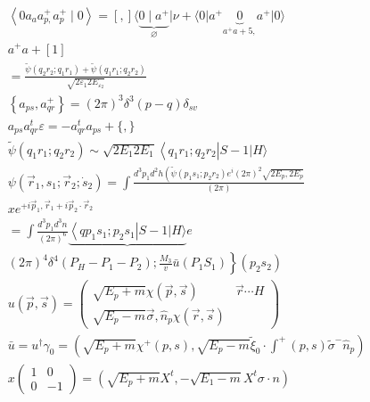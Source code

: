 \documentclass[10pt]{article}
\begin{document}
\[
\begin{aligned}
& \left\langle 0 a_{a} a_{p,}^{+} a_{p}^{+} \mid 0\right\rangle=[,]\langle\underbrace{0 \mid a^{+}}_{\varnothing}| \nu+\langle 0| a^{+} \underbrace{0}_{a^{+} a+5,} a^{+}|0\rangle \\
& a^{+} a+[1] \\
& =\frac{\tilde{\psi}\left(q_{2} r_{2} ; q_{1} r_{1}\right)+\tilde{\psi}\left(q_{1} r_{1} ; q_{2} r_{2}\right)}{\sqrt{2 \varepsilon_{1} 2 E_{\varepsilon_{2}}}} \\
& \left\{a_{p s}, a_{q r}^{+}\right\}=(2 \pi)^{3} \delta^{3}(p-q) \delta_{s v} \\
& a_{p s} a_{q r}^{t} \varepsilon=-a_{q r}^{t} a_{p s}+\{,\} \\
& \widetilde{\psi}\left(q_{1} r_{1} ; q_{2} r_{2}\right) \sim \sqrt{2 E_{1} 2 E_{1}}\left\langle q_{1} r_{1} ; q_{2} r_{2}\right| S-1|H\rangle \\
& \psi\left(\vec{r}_{1}, s_{1} ; \vec{r}_{2} ; \dot{s}_{2}\right)=\int \frac{d^{3} p_{1} d^{2} h\left(\widetilde{\psi}\left(p_{1} s_{1} ; p_{2} r_{2}\right) e^{i}(2 \pi)^{2} \sqrt{2 E_{p}, 2 E_{p}}\right.}{(2 \pi)} \\
& x e^{+i \vec{p}_{1}, \vec{r}_{1}+i \vec{p}_{2} \cdot \vec{r}_{2}} \\
& =\int \frac{d^{3} p_{1} d^{3} n}{(2 \pi)^{6}} \underbrace{\left\langle q p_{1} s_{1} ; p_{2} s_{1}\right| S-1|H\rangle} e \\
& \left.(2 \pi)^{4} \delta^{4}\left(P_{H}-P_{1}-P_{2}\right) ; \frac{M_{3}}{v} \bar{u}\left(P_{1} S_{1}\right)\right\}\left(p_{2} s_{2}\right) \\
& u(\vec{p}, \vec{s})=\left(\begin{array}{ll}
\sqrt{E_{p}+m} \chi(\vec{p}, \vec{s}) & \vec{r} \cdots H \\
\sqrt{E_{p}-m} \vec{\sigma}, \hat{n}_{p} \chi(\vec{r}, \vec{s})
\end{array}\right) \quad \\
& \bar{u}=u^{\dagger} \gamma_{0}=\left(\sqrt{E_{p}+m} \chi^{+}(p, s), \sqrt{E_{p}-m} \tilde{\xi}_{0} \cdot \int^{+}(p, s) \tilde{\sigma}^{-} \hat{n}_{p}\right) \\
& x\left(\begin{array}{cc}
1 & 0 \\
0 & -1
\end{array}\right)=\left(\sqrt{E_{p}+m} X^{t},-\sqrt{E_{1}-m} X^{t} \sigma \cdot n\right)
\end{aligned}
\]
\end{document}
